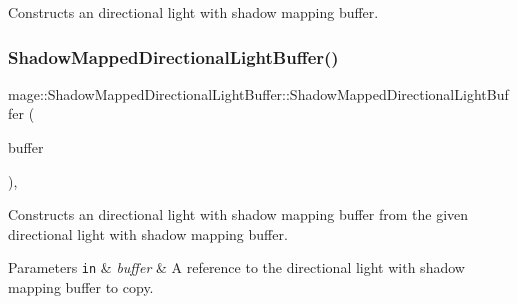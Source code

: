 Constructs an directional light with shadow mapping buffer. \hypertarget{structmage_1_1_shadow_mapped_directional_light_buffer_a45eed8c29165d683e6bee243c4193eee}{}\label{structmage_1_1_shadow_mapped_directional_light_buffer_a45eed8c29165d683e6bee243c4193eee} 
\subsubsection{\texorpdfstring{Shadow\+Mapped\+Directional\+Light\+Buffer()}{ShadowMappedDirectionalLightBuffer()}\hspace{0.1cm}{\footnotesize\ttfamily [2/3]}}
{\footnotesize\ttfamily mage\+::\+Shadow\+Mapped\+Directional\+Light\+Buffer\+::\+Shadow\+Mapped\+Directional\+Light\+Buffer (\begin{DoxyParamCaption}\item[{const \hyperlink{structmage_1_1_shadow_mapped_directional_light_buffer}{Shadow\+Mapped\+Directional\+Light\+Buffer} \&}]{buffer }\end{DoxyParamCaption})\hspace{0.3cm}{\ttfamily [default]}, {\ttfamily [noexcept]}}

Constructs an directional light with shadow mapping buffer from the given directional light with shadow mapping buffer.


\begin{DoxyParams}[1]{Parameters}
\mbox{\tt in}  & {\em buffer} & A reference to the directional light with shadow mapping buffer to copy. \\
\hline
\end{DoxyParams}
\hypertarget{structmage_1_1_shadow_mapped_directional_light_buffer_a333731fdab65ae9c05f64f36ddb8cac0}{}\label{structmage_1_1_shadow_mapped_directional_light_buffer_a333731fdab65ae9c05f64f36ddb8cac0} 
